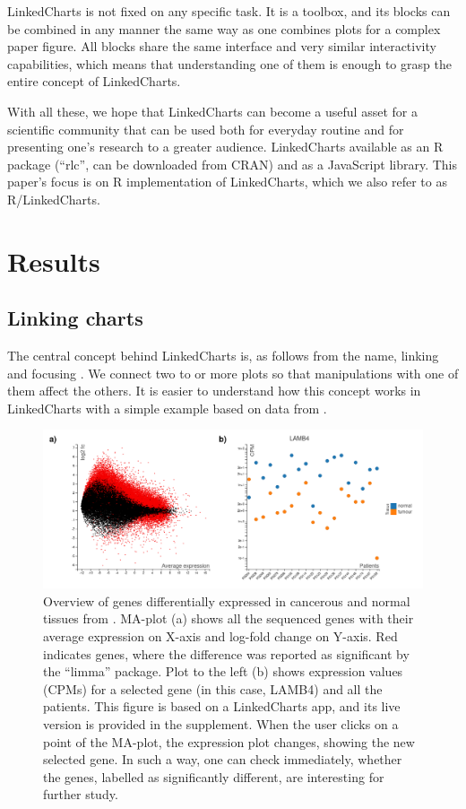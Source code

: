 \documentclass[twocolumn,10pt]{article}
\begin{document}
LinkedCharts is not fixed on any specific task. It is a toolbox, and its blocks can be combined in any manner the same way as one combines plots for a complex paper figure. All blocks share the same interface and very similar interactivity capabilities, which means that understanding one of them is enough to grasp the entire concept of LinkedCharts.

With all these, we hope that LinkedCharts can become a useful asset for a scientific community that can be used both for everyday routine and for presenting one's research to a greater audience. LinkedCharts available as an R package (``rlc'', can be downloaded from CRAN) and as a JavaScript library. This paper's focus is on R implementation of LinkedCharts, which we also refer to as R/LinkedCharts. 

\section{Results}

\subsection{Linking charts}

The central concept behind LinkedCharts is, as follows from the name, linking and focusing \citep{buja_1991}. We connect two to or more plots so that manipulations with one of them affect the others. It is easier to understand how this concept works in LinkedCharts with a simple example based on data from \citet{conway_2015}.

\begin{figure}
	\includegraphics[width=\textwidth]{FigD/figD.png}
	\caption{Overview of genes differentially expressed in cancerous and normal tissues from \citet{conway_2015}. MA-plot (a) shows all the sequenced genes with their average expression on X-axis and log-fold change on Y-axis. Red indicates genes, where the difference was reported as significant by the ``limma''  \citep{ritchie_2015}  package. Plot to the left (b) shows expression values (CPMs) for a selected gene (in this case, LAMB4) and all the patients. This figure is based on a LinkedCharts app, and its live version is provided in the supplement. When the user clicks on a point of the MA-plot, the expression plot changes, showing the new selected gene. In such a way, one can check immediately, whether the genes, labelled as significantly different, are interesting for further study.}
	\label{FigD}
\end{figure}
\end{document}
